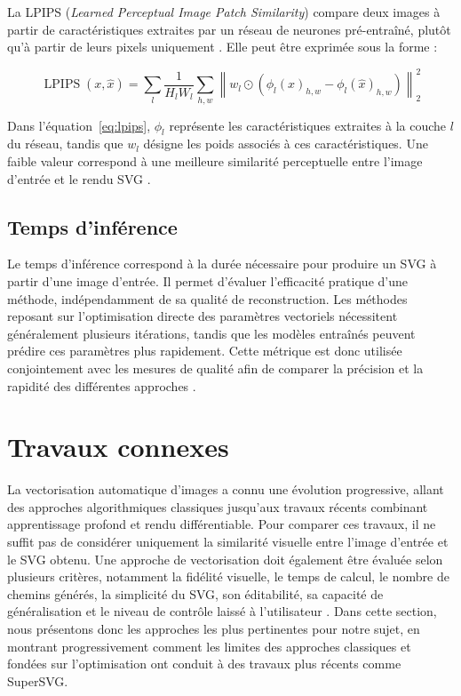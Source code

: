 \documentclass[12pt, a4paper, oneside]{report}
\begin{document}
La LPIPS (\textit{Learned Perceptual Image Patch Similarity}) compare deux images à partir de caractéristiques extraites par un réseau de neurones pré-entraîné, plutôt qu'à partir de leurs pixels uniquement \cite{zhang2018lpips}. Elle peut être exprimée sous la forme :

\begin{equation}
    \operatorname{LPIPS}(x,\hat{x}) =
    \sum_{l}
    \frac{1}{H_lW_l}
    \sum_{h,w}
    \left\|
    w_l \odot
    \left(
    \phi_l(x)_{h,w}
    -
    \phi_l(\hat{x})_{h,w}
    \right)
    \right\|_2^2
    \label{eq:lpips}
\end{equation}

Dans l'équation~\eqref{eq:lpips}, $\phi_l$ représente les caractéristiques extraites à la couche $l$ du réseau, tandis que $w_l$ désigne les poids associés à ces caractéristiques. Une faible valeur correspond à une meilleure similarité perceptuelle entre l'image d'entrée et le rendu SVG \cite{hu2024supersvg}.

\subsection{Temps d'inférence}

Le temps d'inférence correspond à la durée nécessaire pour produire un SVG à partir d'une image d'entrée. Il permet d'évaluer l'efficacité pratique d'une méthode, indépendamment de sa qualité de reconstruction. Les méthodes reposant sur l'optimisation directe des paramètres vectoriels nécessitent généralement plusieurs itérations, tandis que les modèles entraînés peuvent prédire ces paramètres plus rapidement. Cette métrique est donc utilisée conjointement avec les mesures de qualité afin de comparer la précision et la rapidité des différentes approches \cite{hu2024supersvg}.
	
\section{Travaux connexes}

La vectorisation automatique d'images a connu une évolution progressive, allant des approches algorithmiques classiques jusqu'aux travaux récents combinant apprentissage profond et rendu différentiable. Pour comparer ces travaux, il ne suffit pas de considérer uniquement la similarité visuelle entre l'image d'entrée et le SVG obtenu. Une approche de vectorisation doit également être évaluée selon plusieurs critères, notamment la fidélité visuelle, le temps de calcul, le nombre de chemins générés, la simplicité du SVG, son éditabilité, sa capacité de généralisation et le niveau de contrôle laissé à l'utilisateur \cite{dziuba2023imagevectorization}. Dans cette section, nous présentons donc les approches les plus pertinentes pour notre sujet, en montrant progressivement comment les limites des approches classiques et fondées sur l'optimisation ont conduit à des travaux plus récents comme SuperSVG.
\end{document}
